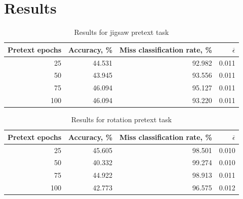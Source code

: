 \section{Results}

\begin{table}[h]
    \begin{tabular}{|r|r|r|r|}
        \hline
        Pretext epochs & Accuracy, \% & Miss classification rate, \% & $\overline{\epsilon}$ \\
        \hline
        25             & 44.531       & 92.982                       & 0.011                 \\
        50             & 43.945       & 93.556                       & 0.011                 \\
        75             & 46.094       & 95.127                       & 0.011                 \\
        100            & 46.094       & 93.220                       & 0.011                 \\
        \hline
    \end{tabular}
    \caption{\label{tab:table-1}Results for jigsaw pretext task}
\end{table}



\begin{table}[h]
    \begin{tabular}{|r|r|r|r|}
        \hline
        Pretext epochs & Accuracy, \% & Miss classification rate, \% & $\overline{\epsilon}$ \\
        \hline
        25             & 45.605       & 98.501                       & 0.010                 \\
        50             & 40.332       & 99.274                       & 0.010                 \\
        75             & 44.922       & 98.913                       & 0.011                 \\
        100            & 42.773       & 96.575                       & 0.012                 \\
        \hline
    \end{tabular}
    \caption{\label{tab:table-2}Results for rotation pretext task}
\end{table}

